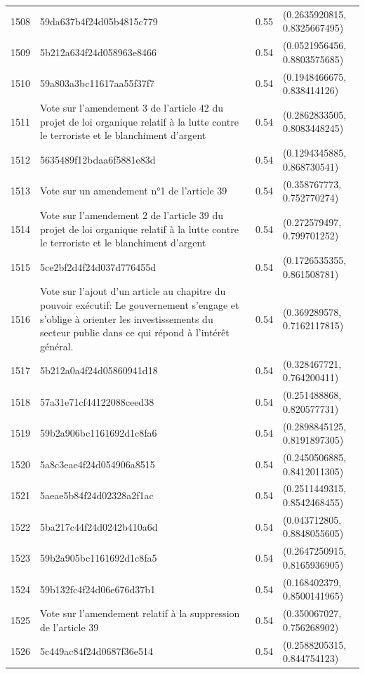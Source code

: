 \begin{table}[ht]
\begin{tabular}{rlrl}
  1508 & 59da637b4f24d05b4815c779 & 0.55 & (0.2635920815, 0.8325667495) \\ 
  1509 & 5b212a634f24d058963e8466 & 0.54 & (0.0521956456, 0.8803575685) \\ 
  1510 & 59a803a3bc11617aa55f37f7 & 0.54 & (0.1948466675, 0.838414126) \\ 
  1511 & Vote sur l'amendement 3 de l'article 42 du projet de loi organique relatif à la lutte contre le terroriste et le blanchiment d'argent & 0.54 & (0.2862833505, 0.8083448245) \\ 
  1512 & 5635489f12bdaa6f5881e83d & 0.54 & (0.1294345885, 0.868730541) \\ 
  1513 & Vote sur un amendement n°1 de l'article 39 & 0.54 & (0.358767773, 0.752770274) \\ 
  1514 & Vote sur l'amendement 2 de l'article 39 du projet de loi organique relatif à la lutte contre le terroriste et le blanchiment d'argent & 0.54 & (0.272579497, 0.799701252) \\ 
  1515 & 5ce2bf2d4f24d037d776455d & 0.54 & (0.1726535355, 0.861508781) \\ 
  1516 & Vote sur l'ajout d'un article au chapitre du pouvoir exécutif: Le gouvernement s’engage et s’oblige à orienter les investissements du secteur public dans ce qui répond à l’intérêt général. & 0.54 & (0.369289578, 0.7162117815) \\ 
  1517 & 5b212a0a4f24d05860941d18 & 0.54 & (0.328467721, 0.764200411) \\ 
  1518 & 57a31e71cf44122088ceed38 & 0.54 & (0.251488868, 0.820577731) \\ 
  1519 & 59b2a906bc1161692d1c8fa6 & 0.54 & (0.2898845125, 0.8191897305) \\ 
  1520 & 5a8c3eae4f24d054906a8515 & 0.54 & (0.2450506885, 0.8412011305) \\ 
  1521 & 5aeae5b84f24d02328a2f1ac & 0.54 & (0.2511449315, 0.8542468455) \\ 
  1522 & 5ba217c44f24d0242b410a6d & 0.54 & (0.043712805, 0.8848055605) \\ 
  1523 & 59b2a905bc1161692d1c8fa5 & 0.54 & (0.2647250915, 0.8165936905) \\ 
  1524 & 59b132fc4f24d06e676d37b1 & 0.54 & (0.168402379, 0.8500141965) \\ 
  1525 & Vote sur l'amendement relatif à la suppression de l'article 39 & 0.54 & (0.350067027, 0.756268902) \\ 
  1526 & 5c449ac84f24d0687f36e514 & 0.54 & (0.2588205315, 0.844754123) \\ 

\end{tabular}
\end{table}
